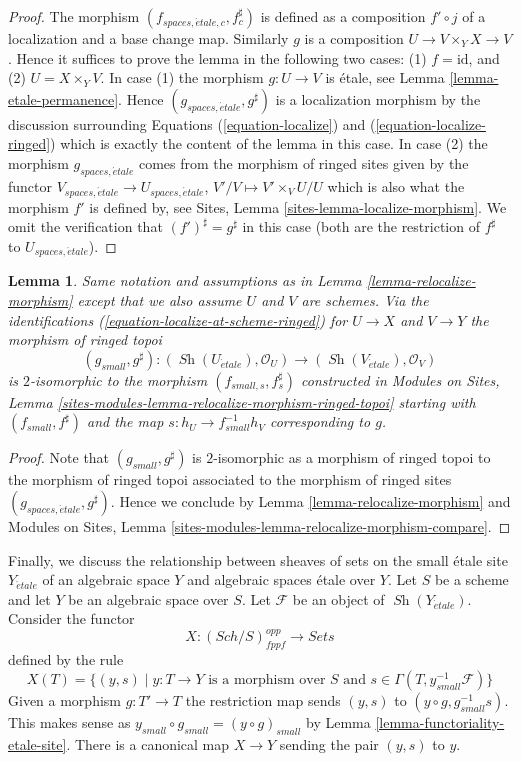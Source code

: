 \documentclass{stacks-project}
\theoremstyle{plain}
\newtheorem{lemma}[subsection]{Lemma}
\theoremstyle{definition}
\theoremstyle{remark}
\numberwithin{equation}{subsection}
\def\Sch{\mathit{Sch}}
\def\Sh{\mathop{\mathit{Sh}}\nolimits}
\def\etale{{\acute{e}tale}}
\begin{document}
\begin{proof}
The morphism $(f_{spaces, \etale, c}, f_c^\sharp)$ is defined as a
composition $f' \circ j$
of a localization and a base change map. Similarly $g$ is a composition
$U \to V \times_Y X \to V$. Hence it suffices to prove
the lemma in the following two cases: (1) $f = \text{id}$, and
(2) $U = X \times_Y V$. In case (1) the morphism $g : U \to V$ is
\'etale, see
Lemma \ref{lemma-etale-permanence}.
Hence $(g_{spaces, \etale}, g^\sharp)$ is a localization morphism
by the discussion surrounding
Equations (\ref{equation-localize}) and
(\ref{equation-localize-ringed})
which is exactly the content of the lemma in this case.
In case (2) the morphism $g_{spaces, \etale}$
comes from the morphism of ringed sites given by the functor
$V_{spaces, \etale} \to U_{spaces, \etale}$,
$V'/V \mapsto V' \times_V U/U$
which is also what the morphism $f'$ is defined by, see
Sites, Lemma \ref{sites-lemma-localize-morphism}.
We omit the verification that $(f')^\sharp = g^\sharp$
in this case (both are the restriction of $f^\sharp$
to $U_{spaces, \etale}$).
\end{proof}

\begin{lemma}
\label{lemma-relocalize-morphism-at-schemes}
Same notation and assumptions as in
Lemma \ref{lemma-relocalize-morphism}
except that we also assume $U$ and $V$ are schemes.
Via the identifications
(\ref{equation-localize-at-scheme-ringed})
for $U \to X$ and $V \to Y$ the morphism of ringed topoi
$$
(g_{small}, g^\sharp) :
(\Sh(U_\etale), \mathcal{O}_U)
\longrightarrow
(\Sh(V_\etale), \mathcal{O}_V)
$$
is $2$-isomorphic to the morphism $(f_{small, s}, f_s^\sharp)$
constructed in
Modules on Sites,
Lemma \ref{sites-modules-lemma-relocalize-morphism-ringed-topoi}
starting with $(f_{small}, f^\sharp)$ and
the map $s : h_U \to f_{small}^{-1}h_V$ corresponding to $g$.
\end{lemma}

\begin{proof}
Note that $(g_{small}, g^\sharp)$ is $2$-isomorphic as a
morphism of ringed topoi to the morphism of ringed topoi
associated to the morphism of ringed sites
$(g_{spaces, \etale}, g^\sharp)$. Hence we conclude by
Lemma \ref{lemma-relocalize-morphism}
and
Modules on Sites,
Lemma \ref{sites-modules-lemma-relocalize-morphism-compare}.
\end{proof}

\noindent
Finally, we discuss the relationship between sheaves of sets on the small
\'etale site $Y_\etale$ of an algebraic space $Y$ and algebraic spaces
\'etale over $Y$. Let $S$ be a scheme and let $Y$ be an algebraic space
over $S$. Let $\mathcal{F}$ be an object of $\Sh(Y_\etale)$. Consider
the functor
$$
X : (\Sch/S)_{fppf}^{opp} \longrightarrow \textit{Sets}
$$
defined by the rule
$$
X(T) = \{(y, s) \mid y : T \to Y\text{ is a morphism over }S\text{ and }
s \in \Gamma(T, y_{small}^{-1}\mathcal{F})\}
$$
Given a morphism $g : T' \to T$ the restriction map sends
$(y, s)$ to $(y \circ g, g_{small}^{-1}s)$. This makes sense
as $y_{small} \circ g_{small} = (y \circ g)_{small}$ by
Lemma \ref{lemma-functoriality-etale-site}. There is a canonical map
$X \to Y$ sending the pair $(y, s)$ to $y$.
\end{document}
